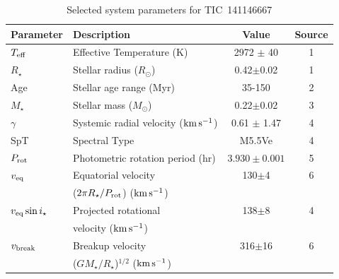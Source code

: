 \documentclass{nature3}
\newcommand{\kms}{\ensuremath{\rm km\,s^{-1}}}
\begin{document}
\begin{table}
\small
\setlength{\tabcolsep}{2pt}
\centering
\caption{Selected system parameters for TIC~141146667}
\label{tab:params}
\begin{tabular}{llcc}
\hline \hline
Parameter & Description & Value & Source\\
\hline 
%
$T_{\rm eff}$\dotfill                   & Effective Temperature (K) \hspace{9pt}\dotfill                 & 2972 $\pm$ 40    & 1 \\
%
$R_\star$\dotfill                       & Stellar radius ($R_\odot$)\dotfill                             & 0.42$\pm$0.02    & 1 \\
%
Age                                     & Stellar age range (Myr)\dotfill                                & 35-150           & 2 \\
%
$M_\star$\dotfill                       & Stellar mass ($M_\odot$)\dotfill                               & 0.22$\pm$0.02    & 3 \\
%
$\gamma$\dotfill                        & Systemic radial velocity (\kms)\dotfill                        & 0.61 $\pm$ 1.47  & 4 \\
%
SpT\dotfill                      & Spectral Type\dotfill                                          & M5.5Ve           & 4 \\
%
$P_{\rm rot}$\dotfill                   & Photometric rotation period (hr)\dotfill                       & $3.930\pm 0.001$ & 5 \\
%
$v_{\rm eq}$\dotfill		                & Equatorial velocity \dotfill                                   &  130$\pm$4       & 6 \\
                                        & \hspace{3pt} ($2\pi R_\star/P_{\rm rot}$) (\kms)	             &                      \\
%
$v_{\rm eq}\sin{i_\star}$\dotfill		    & Projected rotational\dotfill                                   &  138$\pm$8       & 4 \\
                                        & \hspace{3pt} velocity (\kms)	                                 &                      \\
%
$v_{\rm break}$\dotfill		              & Breakup velocity \dotfill                                      &  316$\pm$16      & 6 \\
                                        & \hspace{3pt} ($G M_\star / R_\star$)$^{1/2}$ (\kms)	           &                      \\

\end{tabular}
\end{table}
\end{document}
